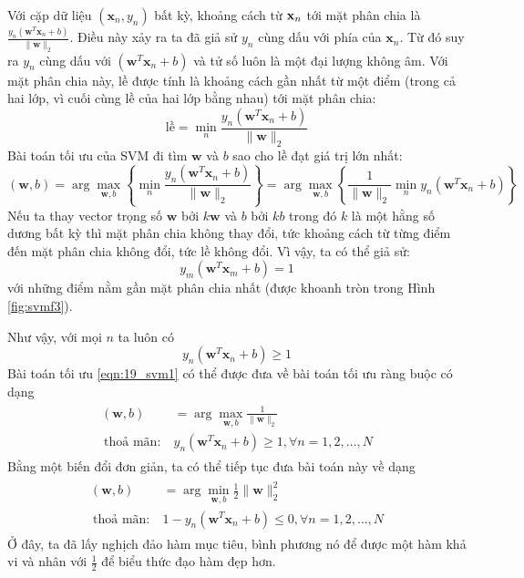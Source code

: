 Với cặp dữ liệu
$(\mathbf{x}_n, y_n)$ bất kỳ, khoảng cách từ $\mathbf{x}_n$ tới mặt phân chia là
\begin{math}
\frac{y_n(\mathbf{w}^T\mathbf{x}_n + b)}{\|\mathbf{w}\|_2}
\end{math}.
Điều này xảy ra ta đã giả sử $y_n$ cùng dấu với {phía} của $\mathbf{x}_n$. Từ đó suy ra $y_n$ cùng dấu với
$(\mathbf{w}^T\mathbf{x}_n + b)$ và tử số luôn là một đại lượng không âm.
Với mặt phân chia này, lề được tính là khoảng cách gần nhất từ một
điểm (trong cả hai lớp, vì cuối cùng lề của hai lớp bằng nhau)
tới mặt phân chia:
\begin{equation*}
\text{lề} = \min_{n} \frac{y_n(\mathbf{w}^T\mathbf{x}_n + b)}{\|\mathbf{w}\|_2}
\end{equation*}
Bài toán tối ưu của SVM đi tìm $\mathbf{w}$ và $b$ sao cho lề đạt giá trị lớn nhất:
\begin{equation}
\label{eqn:19_svm1}
(\mathbf{w}, b) = \arg\max_{\mathbf{w}, b} \left\{
\min_{n} \frac{y_n(\mathbf{w}^T\mathbf{x}_n + b)}{\|\mathbf{w}\|_2}
\right\}
= \arg\max_{\mathbf{w}, b}\left\{
\frac{1}{\|\mathbf{w}\|_2} \min_{n} y_n(\mathbf{w}^T\mathbf{x}_n + b)
\right\}
\end{equation}
Nếu ta thay vector trọng số $\mathbf{w}$ bởi
$k\mathbf{w}$ và $b$ bởi $kb$ trong đó $k$ là một hằng số dương {bất kỳ}
thì mặt phân chia không thay đổi, tức khoảng cách từ từng điểm đến mặt phân chia
không đổi, tức lề không đổi. Vì vậy, ta có thể giả
sử:
\begin{equation*}
y_m(\mathbf{w}^T\mathbf{x}_m + b) = 1 %
\end{equation*}
{với những điểm nằm gần mặt phân chia nhất} (được khoanh tròn trong Hình \ref{fig:svmf3}).

Như vậy, với mọi $n$ ta luôn có
\begin{equation*}
y_n(\mathbf{w}^T\mathbf{x}_n + b) \geq 1
\end{equation*}
Bài toán tối ưu \eqref{eqn:19_svm1} có thể được đưa về bài toán tối ưu ràng buộc có dạng
\begin{eqnarray}
\begin{aligned}
(\mathbf{w}, b) &= \arg \max_{\mathbf{w}, b} \frac{1}{\|\mathbf{w}\|_2}   \\\
\text{thoả mãn:}~ & y_n(\mathbf{w}^T\mathbf{x}_n + b) \geq 1, \forall n = 1, 2, \dots, N
\end{aligned}
\end{eqnarray}
Bằng một biến đổi đơn giản, ta có thể tiếp tục đưa bài toán này về dạng
\begin{eqnarray}
\label{eqn:19_svm3}
\begin{aligned}
(\mathbf{w}, b) &= \arg \min_{\mathbf{w}, b} \frac{1}{2}\|\mathbf{w}\|_2^2   \\\
\text{thoả mãn:}~ & 1 - y_n(\mathbf{w}^T\mathbf{x}_n + b) \leq 0, \forall n = 1, 2, \dots, N
\end{aligned}
\end{eqnarray}
Ở đây, ta đã lấy nghịch đảo hàm mục tiêu, bình phương nó để được một hàm
khả vi và nhân với $\displaystyle\frac{1}{2}$ để biểu thức đạo hàm đẹp hơn.


